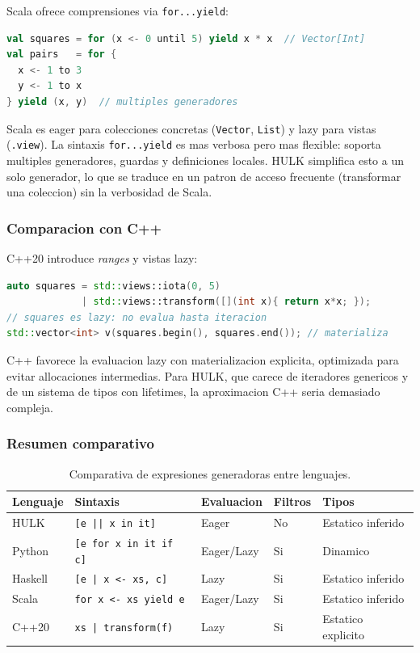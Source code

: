 \documentclass[12pt,a4paper]{article}
\begin{document}
Scala ofrece comprensiones via \texttt{for...yield}:

\begin{lstlisting}[language=Scala, caption={For-comprehension en Scala}]
val squares = for (x <- 0 until 5) yield x * x  // Vector[Int]
val pairs   = for {
  x <- 1 to 3
  y <- 1 to x
} yield (x, y)  // multiples generadores
\end{lstlisting}

Scala es eager para colecciones concretas (\texttt{Vector}, \texttt{List}) y lazy
para vistas (\texttt{.view}). La sintaxis \texttt{for...yield} es mas verbosa pero
mas flexible: soporta multiples generadores, guardas y definiciones locales. HULK
simplifica esto a un solo generador, lo que se traduce en un patron de acceso
frecuente (transformar una coleccion) sin la verbosidad de Scala.

\subsubsection{Comparacion con C++}

C++20 introduce \textit{ranges} y vistas lazy:

\begin{lstlisting}[language=C++, caption={Ranges y views en C++20 (lazy)}]
auto squares = std::views::iota(0, 5)
             | std::views::transform([](int x){ return x*x; });
// squares es lazy: no evalua hasta iteracion
std::vector<int> v(squares.begin(), squares.end()); // materializa
\end{lstlisting}

C++ favorece la evaluacion lazy con materializacion explicita, optimizada para
evitar allocaciones intermedias. Para HULK, que carece de iteradores genericos y
de un sistema de tipos con lifetimes, la aproximacion C++ seria demasiado compleja.

\subsubsection{Resumen comparativo}

\begin{table}[H]
\centering
\begin{tabular}{lllll}
\toprule
\textbf{Lenguaje} & \textbf{Sintaxis} & \textbf{Evaluacion} & \textbf{Filtros}
  & \textbf{Tipos} \\
\midrule
HULK    & \texttt{[e || x in it]} & Eager  & No  & Estatico inferido \\
Python  & \texttt{[e for x in it if c]} & Eager/Lazy & Si & Dinamico \\
Haskell & \texttt{[e | x <- xs, c]} & Lazy & Si & Estatico inferido \\
Scala   & \texttt{for x <- xs yield e} & Eager/Lazy & Si & Estatico inferido \\
C++20   & \texttt{xs | transform(f)} & Lazy & Si & Estatico explicito \\
\bottomrule
\end{tabular}
\caption{Comparativa de expresiones generadoras entre lenguajes.}
\end{table}
\end{document}
